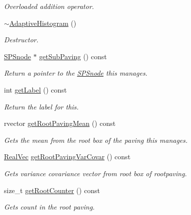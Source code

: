 \begin{DoxyCompactItemize}
\begin{DoxyCompactList}\small\item\em \-Overloaded addition operator. \end{DoxyCompactList}\item 
\hyperlink{classsubpavings_1_1AdaptiveHistogram_aa11b3ed173c858fec6234c7e0b9d9829}{$\sim$\-Adaptive\-Histogram} ()
\begin{DoxyCompactList}\small\item\em \-Destructor. \end{DoxyCompactList}\item 
\hyperlink{classsubpavings_1_1SPSnode}{\-S\-P\-Snode} $\ast$ \hyperlink{classsubpavings_1_1AdaptiveHistogram_aecbdfe366fa381c0b3f7a7b00447dedb}{get\-Sub\-Paving} () const 
\begin{DoxyCompactList}\small\item\em \-Return a pointer to the \hyperlink{classsubpavings_1_1SPSnode}{\-S\-P\-Snode} this manages. \end{DoxyCompactList}\item 
int \hyperlink{classsubpavings_1_1AdaptiveHistogram_adc2a97bb7f8fc3c543f90ba876515ca1}{get\-Label} () const 
\begin{DoxyCompactList}\small\item\em \-Return the label for this. \end{DoxyCompactList}\item 
rvector \hyperlink{classsubpavings_1_1AdaptiveHistogram_a95d9506c9ceea0359b99b0e36f1eff91}{get\-Root\-Paving\-Mean} () const 
\begin{DoxyCompactList}\small\item\em \-Gets the mean from the root box of the paving this manages. \end{DoxyCompactList}\item 
\hyperlink{namespacesubpavings_af2d57bb6e12f4a73169f2e496d6a641f}{\-Real\-Vec} \hyperlink{classsubpavings_1_1AdaptiveHistogram_a2bbfcf884ee91c2457eb2e9d2b81e31f}{get\-Root\-Paving\-Var\-Covar} () const 
\begin{DoxyCompactList}\small\item\em \-Gets variance covariance vector from root box of rootpaving. \end{DoxyCompactList}\item 
size\-\_\-t \hyperlink{classsubpavings_1_1AdaptiveHistogram_a7386f85d1182ae6e3f32766c4a208c11}{get\-Root\-Counter} () const 
\begin{DoxyCompactList}\small\item\em \-Gets count in the root paving. \end{DoxyCompactList}\item 

\end{DoxyCompactItemize}
